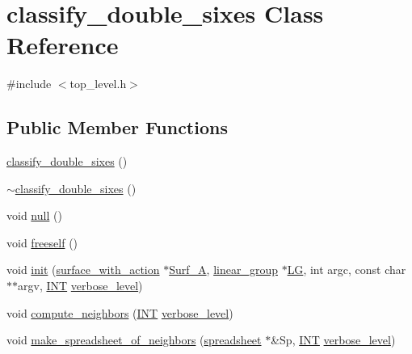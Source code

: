 \hypertarget{classclassify__double__sixes}{}\section{classify\+\_\+double\+\_\+sixes Class Reference}
\label{classclassify__double__sixes}


{\ttfamily \#include $<$top\+\_\+level.\+h$>$}

\subsection*{Public Member Functions}
\begin{DoxyCompactItemize}
\item 
\mbox{\hyperlink{classclassify__double__sixes_acf03fec019f68b7fde956f33a600ad3e}{classify\+\_\+double\+\_\+sixes}} ()
\item 
\mbox{\hyperlink{classclassify__double__sixes_aa5c5fe670215546d6d78f627b9aa66a0}{$\sim$classify\+\_\+double\+\_\+sixes}} ()
\item 
void \mbox{\hyperlink{classclassify__double__sixes_a6faee7ceb2ebd2f13565c08f85b50f52}{null}} ()
\item 
void \mbox{\hyperlink{classclassify__double__sixes_a9ee9f5cd80985af9e0e0ddecbdf8fe08}{freeself}} ()
\item 
void \mbox{\hyperlink{classclassify__double__sixes_a8c5c41d5124b35379d626480ff225f7b}{init}} (\mbox{\hyperlink{classsurface__with__action}{surface\+\_\+with\+\_\+action}} $\ast$\mbox{\hyperlink{classclassify__double__sixes_a3a91b397cf3814de4f70171a27a1c8bc}{Surf\+\_\+A}}, \mbox{\hyperlink{classlinear__group}{linear\+\_\+group}} $\ast$\mbox{\hyperlink{classclassify__double__sixes_a0861ac69fec896f50578b55c85a9294f}{LG}}, int argc, const char $\ast$$\ast$argv, \mbox{\hyperlink{galois_8h_a09fddde158a3a20bd2dcadb609de11dc}{I\+NT}} \mbox{\hyperlink{simeon_8_c_a818073fbcc2f439e7c56952f67386122}{verbose\+\_\+level}})
\item 
void \mbox{\hyperlink{classclassify__double__sixes_a675e241052c36c58063ddcfc06d209b2}{compute\+\_\+neighbors}} (\mbox{\hyperlink{galois_8h_a09fddde158a3a20bd2dcadb609de11dc}{I\+NT}} \mbox{\hyperlink{simeon_8_c_a818073fbcc2f439e7c56952f67386122}{verbose\+\_\+level}})
\item 
void \mbox{\hyperlink{classclassify__double__sixes_ab1b80dac9133d50c5229ef25ca774aaa}{make\+\_\+spreadsheet\+\_\+of\+\_\+neighbors}} (\mbox{\hyperlink{classspreadsheet}{spreadsheet}} $\ast$\&Sp, \mbox{\hyperlink{galois_8h_a09fddde158a3a20bd2dcadb609de11dc}{I\+NT}} \mbox{\hyperlink{simeon_8_c_a818073fbcc2f439e7c56952f67386122}{verbose\+\_\+level}})
$$
\end{DoxyCompactItemize}

